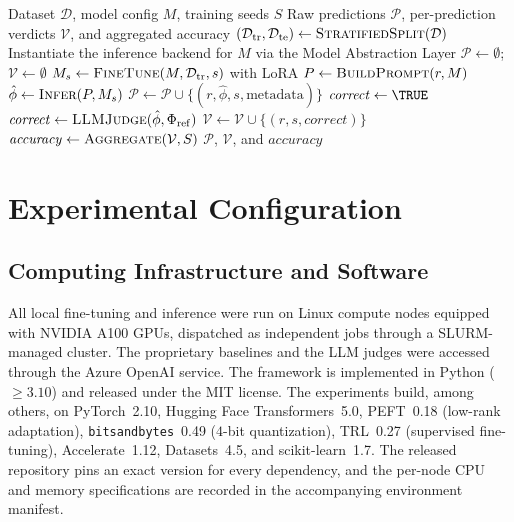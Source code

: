 \documentclass[letterpaper]{article}
\begin{document}
\begin{algorithm}[t]
\caption{NL-to-ATL$^\ast$ Translation and Evaluation}
\label{alg:pipeline}
\begin{algorithmic}[1]
\REQUIRE Dataset $\mathcal{D}$, model config $M$, training seeds $S$
\ENSURE Raw predictions $\mathcal{P}$, per-prediction verdicts $\mathcal{V}$, and aggregated accuracy
\STATE $(\mathcal{D}_{\mathrm{tr}}, \mathcal{D}_{\mathrm{te}}) \gets \textsc{StratifiedSplit}(\mathcal{D})$ 
\STATE Instantiate the inference backend for $M$ via the Model Abstraction Layer
\STATE $\mathcal{P} \gets \emptyset$;\quad $\mathcal{V} \gets \emptyset$ 
    \STATE $M_s \gets \textsc{FineTune}(M, \mathcal{D}_{\mathrm{tr}}, s)$ with LoRA 
        \STATE $P \gets \textsc{BuildPrompt}(r, M)$ 
        \STATE $\hat{\phi} \gets \textsc{Infer}(P, M_s)$ 
        \STATE $\mathcal{P} \gets \mathcal{P} \cup \{(r, \hat{\phi}, s, \text{metadata})\}$
    \ENDFOR
\ENDFOR
{}
        \STATE $\mathit{correct} \gets \TRUE$
    \ELSE
        \STATE $\mathit{correct} \gets \textsc{LLMJudge}(\hat{\phi}, \Phi_{\mathrm{ref}})$
    \ENDIF
    \STATE $\mathcal{V} \gets \mathcal{V} \cup \{(r, s, \mathit{correct})\}$ 
\ENDFOR
\STATE $\mathit{accuracy} \gets \textsc{Aggregate}(\mathcal{V}, S)$ 
\RETURN $\mathcal{P}$, $\mathcal{V}$, and $\mathit{accuracy}$
\end{algorithmic}
\end{algorithm}

\section{Experimental Configuration}
\label{app:config}

\subsection{Computing Infrastructure and Software}
All local fine-tuning and inference were run on Linux compute nodes equipped with NVIDIA A100 GPUs, dispatched as independent jobs through a SLURM-managed cluster. The proprietary baselines and the LLM judges were accessed through the Azure OpenAI service. The framework is implemented in Python ($\geq 3.10$) and released under the MIT license. The experiments build, among others, on PyTorch~2.10, Hugging Face Transformers~5.0, PEFT~0.18 (low-rank adaptation), \texttt{bitsandbytes}~0.49 ($4$-bit quantization), TRL~0.27 (supervised fine-tuning), Accelerate~1.12, Datasets~4.5, and scikit-learn~1.7. The released repository pins an exact version for every dependency, and the per-node CPU and memory specifications are recorded in the accompanying environment manifest.
\end{document}
